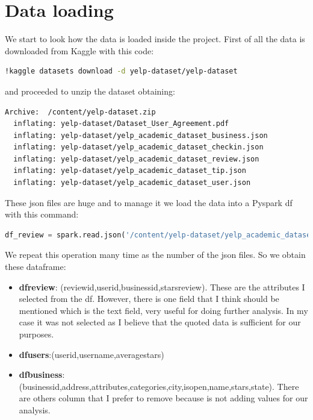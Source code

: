 \documentclass[12pt,english]{report}
\begin{document}
\section{Data loading}
We start to look how the data is loaded inside the project.
First of all the data is downloaded from Kaggle with this code:
\begin{lstlisting}[language={bash},label={lst:datadownload},caption={Download dateset}]
!kaggle datasets download -d yelp-dataset/yelp-dataset
\end{lstlisting}
and proceeded to unzip the dataset obtaining:
\begin{lstlisting}[language={bash},label={lst:datajson},caption={Unzip dateset}]
Archive:  /content/yelp-dataset.zip
  inflating: yelp-dataset/Dataset_User_Agreement.pdf  
  inflating: yelp-dataset/yelp_academic_dataset_business.json  
  inflating: yelp-dataset/yelp_academic_dataset_checkin.json  
  inflating: yelp-dataset/yelp_academic_dataset_review.json  
  inflating: yelp-dataset/yelp_academic_dataset_tip.json  
  inflating: yelp-dataset/yelp_academic_dataset_user.json 
\end{lstlisting}
These json files are huge and to manage it we load the data into a Pyspark df with this command:
\begin{lstlisting}[language={Python},label={lst:loadjson},caption={Loading json data into Pyspark df}]
df_review = spark.read.json('/content/yelp-dataset/yelp_academic_dataset_review.json')
\end{lstlisting}
We repeat this operation many time as the number of the json files.
So we obtain these dataframe:
\begin{itemize}
\item \textbf{df\textunderscore review}: (review\textunderscore id,user\textunderscore id,business\textunderscore id,stars\textunderscore review). These are the attributes I selected from the df. However, there is one field that I think should be mentioned which is the text field, very useful for doing further analysis. In my case it was not selected as I believe that the quoted data is sufficient for our purposes.
\item \textbf{df\textunderscore users}:(user\textunderscore id,username,average\textunderscore stars)
\item \textbf{df\textunderscore business}: (business\textunderscore id,address,attributes,categories,city,is\textunderscore open,name,stars,state). There are others column that I prefer to remove because is not adding values for our analysis.
\end{itemize}
\end{document}
